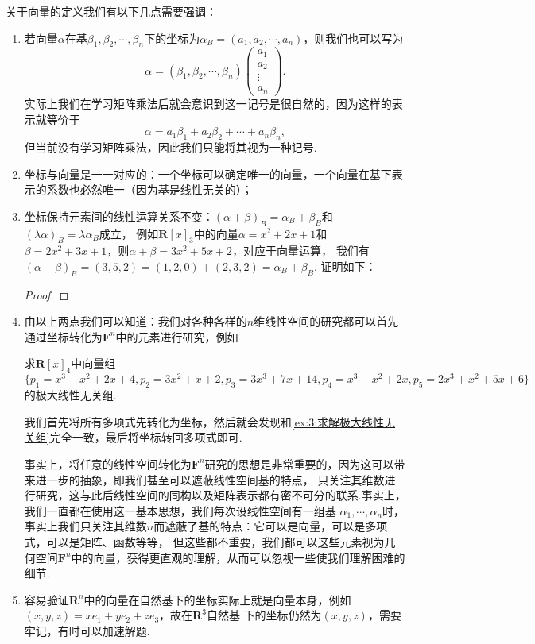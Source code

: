 关于向量的定义我们有以下几点需要强调：
\begin{enumerate}
    \item 若向量$\alpha$在基$\beta_1,\beta_2,\cdots,\beta_n$下的坐标为$\alpha_B=(a_1,a_2,\cdots,a_n)$，则我们也可以写为
    \[\alpha=(\beta_1,\beta_2,\cdots,\beta_n)\begin{pmatrix}
        a_1\\a_2\\\vdots\\a_n
    \end{pmatrix}.\]
    实际上我们在学习矩阵乘法后就会意识到这一记号是很自然的，因为这样的表示就等价于
    \[\alpha=a_1\beta_1+a_2\beta_2+\cdots+a_n\beta_n,\]
    但当前没有学习矩阵乘法，因此我们只能将其视为一种记号.
    \item 坐标与向量是一一对应的：一个坐标可以确定唯一的向量，一个向量在基下表示的系数也必然唯一（因为基是线性无关的）；
    \item 坐标保持元素间的线性运算关系不变：$(\alpha+\beta)_B=\alpha_B+\beta_B$和$(\lambda\alpha)_B=\lambda\alpha_B$成立，
    例如$\mathbf{R}[x]_3$中的向量$\alpha=x^2+2x+1$和$\beta=2x^2+3x+1$，则$\alpha+\beta=3x^2+5x+2$，对应于向量运算，
    我们有$(\alpha+\beta)_B=(3,5,2)=(1,2,0)+(2,3,2)=\alpha_B+\beta_B$.
    证明如下：
    
    \begin{proof}
        
    \end{proof}
    \item 由以上两点我们可以知道：我们对各种各样的$n$维线性空间的研究都可以首先通过坐标转化为$\mathbf{F}^n$中的元素进行研究，例如
    \begin{example}
        求$\mathbf{R}[x]_4$中向量组$\{p_1=x^3-x^2+2x+4,p_2=3x^2+x+2,p_3=3x^3+7x+14,p_4=x^3-x^2+2x,p_5=2x^3+x^2+5x+6\}$
        的极大线性无关组.
    \end{example}
    我们首先将所有多项式先转化为坐标，然后就会发现和\autoref{ex:3:求解极大线性无关组}完全一致，最后将坐标转回多项式即可.

    事实上，将任意的线性空间转化为$\mathbf{F}^n$研究的思想是非常重要的，因为这可以带来进一步的抽象，即我们甚至可以遮蔽线性空间基的特点，
    只关注其维数进行研究，这与此后线性空间的同构以及矩阵表示都有密不可分的联系.事实上，我们一直都在使用这一基本思想，我们每次设线性空间有一组基
    $\alpha_1,\cdots,\alpha_n$时，事实上我们只关注其维数$n$而遮蔽了基的特点：它可以是向量，可以是多项式，可以是矩阵、函数等等，
    但这些都不重要，我们都可以这些元素视为几何空间$\mathbf{F}^n$中的向量，获得更直观的理解，从而可以忽视一些使我们理解困难的细节.
    \item 容易验证$\mathbf{R}^n$中的向量在自然基下的坐标实际上就是向量本身，例如$(x,y,z)=xe_1+ye_2+ze_3$，故在$\mathbf{R}^3$自然基
    下的坐标仍然为$(x,y,z)$，需要牢记，有时可以加速解题.
\end{enumerate}

